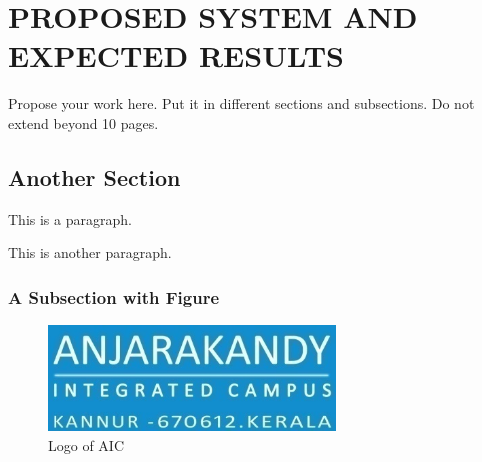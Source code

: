 \chapter{PROPOSED SYSTEM AND EXPECTED RESULTS}
\par Propose your work here. Put it in different sections and subsections. Do not extend beyond 10 pages.

\section{Another Section}
\par This is a paragraph.
\par This is another paragraph.

\subsection{A Subsection with Figure}
\begin{figure}[h]
\centering
\includegraphics[width=3in]{images/aic.png}
\caption{Logo of AIC}
\end{figure}
\newpage
